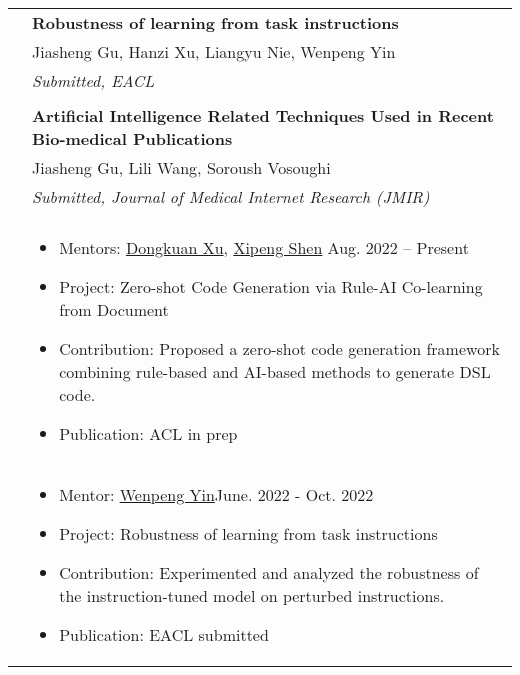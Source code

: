 \documentclass[letterpaper, 10pt]{article}
\begin{document}
\begin{longtable}{p{1.3in}p{4.8in}}
& \textbf{Robustness of learning from task instructions \label{robustness_instruction}} \\
& Jiasheng Gu, Hanzi Xu, Liangyu Nie, Wenpeng Yin \\
& \textit{Submitted, EACL}\\
& \\

& \textbf{Artificial Intelligence Related Techniques Used in Recent Bio-medical Publications} \label{JMIR} \\
& Jiasheng Gu, Lili Wang, Soroush Vosoughi \\
& \textit{Submitted, Journal of Medical Internet Research (JMIR)}\\
& \\


\nohyphens{\color{black}{Research Experience}} 

&  \begin{itemize}[leftmargin=10pt, itemsep=-5pt, topsep=0pt,before=\textbf{North Carolina State University}]
    \item Mentors: \href{http://personal.psu.edu/dux19/}{Dongkuan Xu}, \href{https://people.engr.ncsu.edu/xshen5/}{Xipeng Shen} \hfill Aug. 2022 -- Present 
    \item Project: Zero-shot Code Generation via Rule-AI Co-learning from Document
    \item Contribution: Proposed a zero-shot code generation framework combining rule-based and AI-based methods to generate DSL code.
    \item Publication: ACL in prep
  \end{itemize}\\ 
  

&  \begin{itemize}[leftmargin=10pt, itemsep=-5pt, topsep=0pt,before=\textbf{Pennsylvania State University}]
    \item Mentor: \href{https://www.wenpengyin.org/}{Wenpeng Yin}\hfill June. 2022 - Oct. 2022
    \item Project: Robustness of learning from task instructions\hfill
    \item Contribution: Experimented and analyzed the robustness of the instruction-tuned model on perturbed instructions.
    \item Publication: EACL submitted
  \end{itemize}\\ 


\end{longtable}
\end{document}
